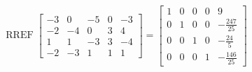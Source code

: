 \begin{exerciseAnswer} 


\[\operatorname{RREF} \left[\begin{array}{ccccc}
-3 & 0 & -5 & 0 & -3 \\
-2 & -4 & 0 & 3 & 4 \\
1 & 1 & -3 & 3 & -4 \\
-2 & -3 & 1 & 1 & 1
\end{array}\right] = \left[\begin{array}{ccccc}
1 & 0 & 0 & 0 & 9 \\
0 & 1 & 0 & 0 & -\frac{247}{25} \\
0 & 0 & 1 & 0 & -\frac{24}{5} \\
0 & 0 & 0 & 1 & -\frac{146}{25}
\end{array}\right] \]



\end{exerciseAnswer}
